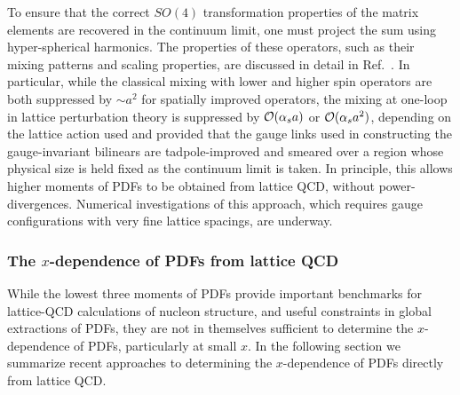 To ensure that the correct $SO(4)$ transformation properties of the matrix elements are recovered in the continuum limit, one must project the sum using hyper-spherical harmonics.
%
The properties of these operators, such as their mixing patterns and scaling properties, are discussed in detail in
Ref.~\cite{Davoudi:2012ya}.
%
In particular, while the classical mixing with lower and higher spin operators are both suppressed by $\sim a^2$ for spatially improved operators, the mixing at one-loop in lattice perturbation theory is suppressed by ${\cal O}(\alpha_s a)$ or ${\cal O}(\alpha_s a^2)$, depending on the lattice action used and provided that the gauge links used in constructing the gauge-invariant bilinears are tadpole-improved and smeared over a region whose physical size is held fixed as the continuum limit is taken. In principle, this allows higher moments of PDFs to be obtained from lattice QCD, without power-divergences. Numerical investigations of this approach,
which requires gauge configurations with very fine lattice spacings, are underway.

\subsubsection{The $x$-dependence of PDFs from lattice QCD}
\label{sec:xdependence}

While the lowest three moments of PDFs provide important benchmarks for lattice-QCD calculations of nucleon structure, and useful constraints in global extractions of PDFs, they are not in themselves sufficient to determine the $x$-dependence of PDFs, particularly at small $x$.
%
In the following section we summarize recent approaches to determining the $x$-dependence of PDFs directly from lattice QCD.

